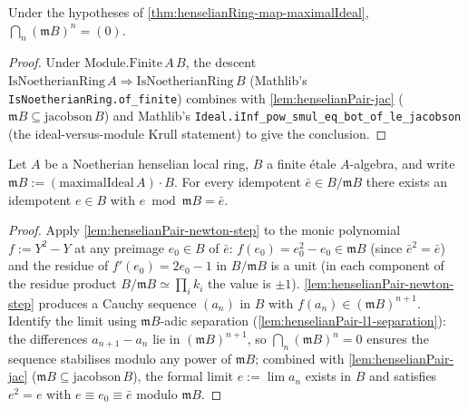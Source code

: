 \begin{lemma}
\label{lem:henselianPair-l1-separation}
\leanok
Under the hypotheses of \cref{thm:henselianRing-map-maximalIdeal},
$\bigcap_{n} (\mathfrak m B)^n = (0)$.
\end{lemma}

\begin{proof}

\leanok
Under $\mathrm{Module.Finite}\,A\,B$, the descent
$\mathrm{IsNoetherianRing}\,A \Rightarrow
\mathrm{IsNoetherianRing}\,B$ (Mathlib's
\texttt{IsNoetherianRing.of\_finite}) combines with
\cref{lem:henselianPair-jac} ($\mathfrak m B \subseteq
\mathrm{jacobson}\,B$) and Mathlib's
\texttt{Ideal.iInf\_pow\_smul\_eq\_bot\_of\_le\_jacobson} (the
ideal-versus-module Krull statement) to give the conclusion.
\end{proof}

\begin{lemma}
\label{lem:henselianPair-l3a-idempotent-lift}
Let $A$ be a Noetherian henselian local ring, $B$ a finite étale
$A$-algebra, and write $\mathfrak m B :=
(\mathrm{maximalIdeal}\,A)\cdot B$. For every idempotent
$\bar e \in B/\mathfrak m B$ there exists an idempotent $e \in B$
with $e \bmod \mathfrak m B = \bar e$.
\end{lemma}

\begin{proof}

\leanok
Apply \cref{lem:henselianPair-newton-step} to the monic polynomial
$f := Y^2 - Y$ at any preimage $e_0 \in B$ of $\bar e$:
$f(e_0) = e_0^2 - e_0 \in \mathfrak m B$ (since $\bar e^2 = \bar
e$) and the residue of $f'(e_0) = 2 e_0 - 1$ in $B/\mathfrak m B$
is a unit (in each component of the residue product
$B/\mathfrak m B \simeq \prod_i k_i$ the value is $\pm 1$).
\cref{lem:henselianPair-newton-step} produces a Cauchy sequence
$(a_n)$ in $B$ with $f(a_n) \in (\mathfrak m B)^{n+1}$. Identify
the limit using $\mathfrak m B$-adic separation
(\cref{lem:henselianPair-l1-separation}): the differences
$a_{n+1} - a_n$ lie in $(\mathfrak m B)^{n+1}$, so
$\bigcap_n (\mathfrak m B)^n = 0$ ensures the sequence
stabilises modulo any power of $\mathfrak m B$; combined with
\cref{lem:henselianPair-jac} ($\mathfrak m B \subseteq
\mathrm{jacobson}\,B$), the formal limit $e := \lim a_n$ exists
in $B$ and satisfies $e^2 = e$ with $e \equiv e_0 \equiv \bar e$
modulo $\mathfrak m B$.
\end{proof}

